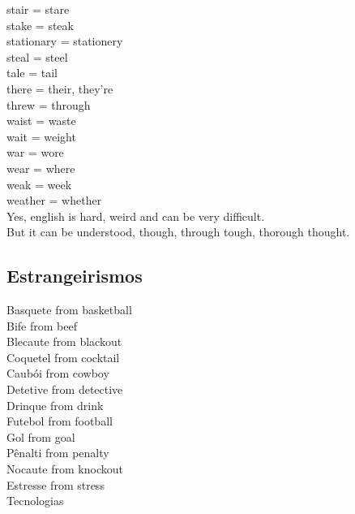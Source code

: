 \documentclass[12pt,a4paper]{article} %
\begin{document}
	stair = stare\\
	stake = steak\\
	stationary = stationery\\
	steal = steel\\
	tale = tail\\
	there = their, they're\\
	threw = through\\
	waist = waste\\
	wait = weight\\
	war = wore\\
	wear = where\\
	weak = week\\
	weather = whether\\
	
	Yes, english is hard, weird and can be very difficult.\\
	But it can be understood, though, through tough, thorough thought.\\

\subsection{Estrangeirismos}

	Basquete from basketball\\
	Bife from beef\\
	Blecaute from blackout\\
	Coquetel from cocktail\\
	Caubói from cowboy\\
	Detetive from detective\\
	Drinque from drink\\
	Futebol from football\\
	Gol from goal\\
	Pênalti from penalty\\
	Nocaute from knockout\\
	Estresse from stress\\
	
	Tecnologias\\
	
\end{document}
